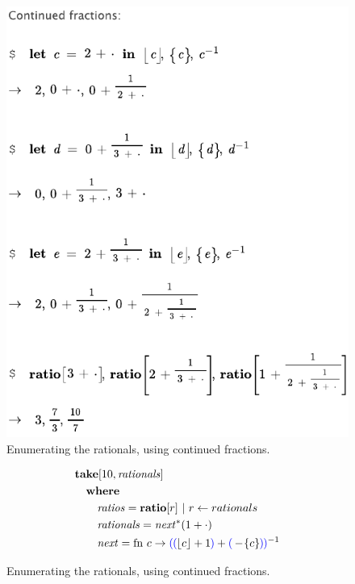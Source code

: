 \begin{figure}[h]
  \begin{center}
  
  \includegraphics[scale=0.8]{src/image/continued.pdf}
  
  
  \end{center}
  \caption{Enumerating the rationals, using continued fractions.}
  \label{fig-cfex}
\end{figure}

\begin{figure}[h]
  \begin{center}
  
  \begin{align*}
  & \mathbf{take}[10, \mathit{rationals}]
  \\
  & \quad \mathbf{where}
  \\
  & \qquad \mathit{ratios} = \mathbf{ratio}[r] ~ | ~ r \leftarrow rationals
  \\
  & \qquad \mathit{rationals} = \mathit{next}^*(1 + \cdot)
  \\
  & \qquad \mathit{next} = \mathrm{fn} ~ c \to {\color{blue}\left(\!\right.} {\color{blue}\left(\!\right.} \lfloor c \rfloor + 1 {\color{blue}\left.\!\right)} + {\color{blue}\left(\!\right.} -\!\{c\} {\color{blue}\left.\!\right)} {\color{blue}\left.\!\right)}^{-1}
  \end{align*}
    
  
  \end{center}
  \caption{Enumerating the rationals, using continued fractions.}
  \label{fig-rationals}
\end{figure}

